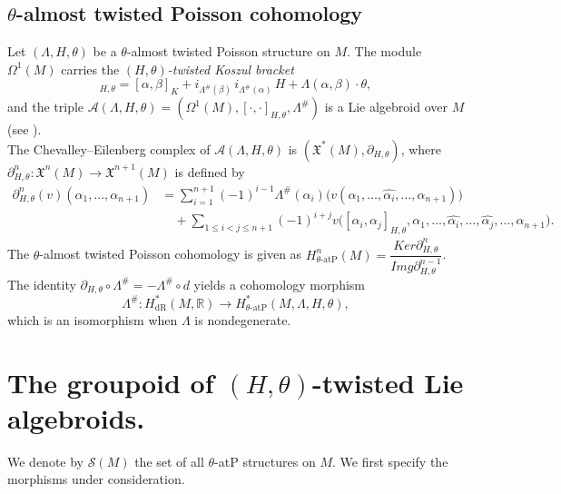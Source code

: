 \documentclass[11pt,a4paper]{article}
\theoremstyle{plain}
\theoremstyle{definition}
\theoremstyle{remark}
\begin{document}
\subsection{$\theta$-almost twisted Poisson cohomology}
\label{subsec:cohomology}
Let   $(\Lambda,H,\theta)$ be a  $\theta$-almost twisted Poisson structure  on $M$.
The module $\Omega^{1}(M)$ carries the \emph{$(H,\theta)$-twisted
Koszul bracket}
\begin{equation*}
  [\alpha,\beta]_{H,\theta}
  = [\alpha,\beta]_{K}
    + i_{\Lambda^{\#}(\beta)}\,i_{\Lambda^{\#}(\alpha)}\,H
    + \Lambda(\alpha,\beta)\cdot\theta,
\end{equation*}
and the triple
$\mathcal{A}(\Lambda,H,\theta)
 =(\Omega^{1}(M),[\cdot,\cdot]_{H,\theta},\Lambda^{\#})$
is a Lie algebroid over $M$ (see \cite{NansidiTangueDongho2025b}).\\



The Chevalley--Eilenberg complex of $\mathcal{A}(\Lambda,H,\theta)$
is $(\mathfrak{X}^{*}(M),\partial_{H,\theta})$, where
$\partial_{H,\theta}^{n}:\mathfrak{X}^{n}(M)\to\mathfrak{X}^{n+1}(M)$ is defined by
\begin{align}
  \partial_{H,\theta}^{n}(v)(\alpha_1,\ldots,\alpha_{n+1})
  &= \sum_{i=1}^{n+1}(-1)^{i-1}
     \Lambda^{\#}(\alpha_i)\bigl(v(\alpha_1,\ldots,\widehat{\alpha_i},\ldots,\alpha_{n+1})\bigr)
  \nonumber\\
  &\quad
  + \!\!\sum_{1\le i<j\le n+1}\!\!(-1)^{i+j}
    v\bigl([\alpha_i,\alpha_j]_{H,\theta},\alpha_1,
           \ldots,\widehat{\alpha_i},\ldots,\widehat{\alpha_j},\ldots,\alpha_{n+1}\bigr).
  \label{eq:opcobord}
\end{align}
The $\theta$-almost twisted Poisson cohomology is given as
$H^{n}_{\theta\text{-atP}}(M) = \dfrac{Ker\partial_{H,\theta}^{n}}{Img\partial_{H,\theta}^{n-1}}$.\\
The  identity $ \partial_{H,\theta}\circ\Lambda^{\#} = -\Lambda^{\#}\circ d$
yields a cohomology morphism\\
$$\Lambda^{\#}: H^{*}_{\mathrm{dR}}(M,\mathbb{R})\to H^{*}_{\theta\text{-atP}}(M,\Lambda,H,\theta),$$
which is an isomorphism when $\Lambda$ is nondegenerate.

\section{The groupoid of $(H,\theta)$-twisted Lie algebroids.}\label{sec:groupoid}
 We denote by $\mathcal{S}(M)$  the set of all $\theta$-atP structures on $M$. We first  specify the morphisms under consideration. 
\end{document}
